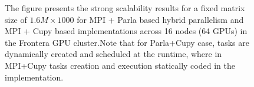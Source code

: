 \documentclass{article}
\begin{document}
\begin{figure}[H]
    \caption{The figure presents the strong scalability results for a fixed matrix size of $1.6M \times 1000$ for MPI + Parla based hybrid parallelism and MPI + Cupy based implementations across 16 nodes (64 GPUs) in the Frontera GPU cluster.Note that for Parla+Cupy case, tasks are dynamically created and scheduled at the runtime, where in MPI+Cupy tasks creation and execution statically coded in the implementation. \label{fig:parla_ss_n1000}
    }
\end{figure}
\end{document}
